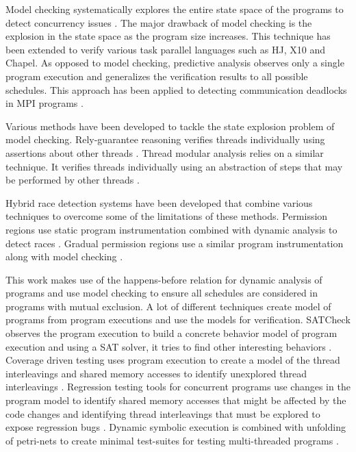 Model checking systematically explores the entire state space of the programs to detect concurrency issues \cite{kulikov2010detecting, vakkalanka2008implementing, Godefroid}. The major drawback of model checking is the explosion in the state space as the program size increases. This technique has been extended to verify various task parallel languages such as HJ, X10 and Chapel\cite{anderson2014jpf, gligoric2012x10x, zirkel2013automated}. As opposed to model checking, predictive analysis observes only a single program execution and generalizes the verification results to all possible schedules. This approach has been applied to detecting communication deadlocks in MPI programs \cite{forejt2014precise}.

Various methods have been developed to tackle the state explosion problem of model checking. Rely-guarantee reasoning verifies threads individually using assertions about other threads \cite{xu1997rely, popeea2012compositional}. Thread modular analysis relies on a similar technique. It verifies threads individually using an abstraction of steps that may be performed by other threads \cite{flanagan2003thread, malkis2007precise, henzinger2003thread, gotsman2007thread}.

Hybrid race detection systems have been developed that combine various techniques to overcome some of the limitations of these methods. Permission regions use static program instrumentation combined with dynamic analysis to detect races \cite{westbrook2012practical, westbrook2012permission}. Gradual permission regions use a similar program instrumentation along with model checking \cite{mercer2015model}. 

This work makes use of the happens-before relation for dynamic analysis of programs and use model checking to ensure all schedules are considered in programs with mutual exclusion. A lot of different techniques create model of programs from program executions and use the models for verification. SATCheck observes the program execution to build a concrete behavior model of program execution and using a SAT solver, it tries to find other interesting behaviors \cite{demsky2015satcheck}. Coverage driven testing uses program execution to create a model of the thread interleavings and shared memory accesses to identify unexplored thread interleavings \cite{hong2012testing, yu2012maple}. Regression testing tools for concurrent programs use changes in the program model to identify shared memory accesses that might be affected by the code changes and identifying thread interleavings that must be explored to expose regression bugs \cite{terragni2015recontest, yu2014simrt}. Dynamic symbolic execution is combined with unfolding of petri-nets to create minimal test-suites for testing multi-threaded programs \cite{leon2015unfolding, kahkonen2015unfolding}.